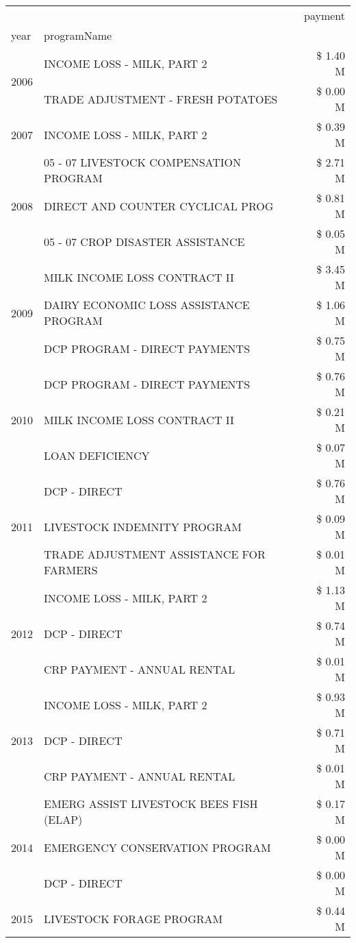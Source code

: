 \begin{tabular}{llr}
\toprule
 &  & payment \\
year & programName &  \\
\midrule
\multirow[t]{2}{*}{2006} & INCOME LOSS - MILK, PART 2 & \$ 1.40 M \\
 & TRADE ADJUSTMENT - FRESH POTATOES & \$ 0.00 M \\
\cline{1-3}
2007 & INCOME LOSS - MILK, PART 2 & \$ 0.39 M \\
\cline{1-3}
\multirow[t]{3}{*}{2008} & 05 - 07 LIVESTOCK COMPENSATION PROGRAM & \$ 2.71 M \\
 & DIRECT AND COUNTER CYCLICAL PROG & \$ 0.81 M \\
 & 05 - 07 CROP DISASTER ASSISTANCE & \$ 0.05 M \\
\cline{1-3}
\multirow[t]{3}{*}{2009} & MILK INCOME LOSS CONTRACT II & \$ 3.45 M \\
 & DAIRY ECONOMIC LOSS ASSISTANCE PROGRAM & \$ 1.06 M \\
 & DCP PROGRAM - DIRECT PAYMENTS & \$ 0.75 M \\
\cline{1-3}
\multirow[t]{3}{*}{2010} & DCP PROGRAM - DIRECT PAYMENTS & \$ 0.76 M \\
 & MILK INCOME LOSS CONTRACT II & \$ 0.21 M \\
 & LOAN DEFICIENCY & \$ 0.07 M \\
\cline{1-3}
\multirow[t]{3}{*}{2011} & DCP - DIRECT & \$ 0.76 M \\
 & LIVESTOCK INDEMNITY PROGRAM & \$ 0.09 M \\
 & TRADE ADJUSTMENT ASSISTANCE FOR FARMERS & \$ 0.01 M \\
\cline{1-3}
\multirow[t]{3}{*}{2012} & INCOME LOSS - MILK, PART 2 & \$ 1.13 M \\
 & DCP - DIRECT & \$ 0.74 M \\
 & CRP PAYMENT - ANNUAL RENTAL & \$ 0.01 M \\
\cline{1-3}
\multirow[t]{3}{*}{2013} & INCOME LOSS - MILK, PART 2 & \$ 0.93 M \\
 & DCP - DIRECT & \$ 0.71 M \\
 & CRP PAYMENT - ANNUAL RENTAL & \$ 0.01 M \\
\cline{1-3}
\multirow[t]{3}{*}{2014} & EMERG ASSIST LIVESTOCK BEES FISH (ELAP) & \$ 0.17 M \\
 & EMERGENCY CONSERVATION PROGRAM & \$ 0.00 M \\
 & DCP - DIRECT & \$ 0.00 M \\
\cline{1-3}
\multirow[t]{3}{*}{2015} & LIVESTOCK FORAGE PROGRAM & \$ 0.44 M \\

\end{tabular}
